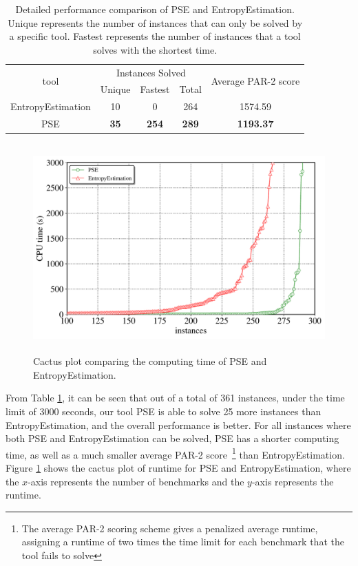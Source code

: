 \begin{table}[h!]
	\centering
	\begin{tabular}{ ccccc } 
		\toprule 
		\multirow{2}{*}{tool}  & \multicolumn{3}{c}{Instances Solved} & \multirow{2}{*}{Average PAR-2 score} \\
		 \cline{2-4}
		& Unique & Fastest & Total \\ 
		\midrule 
		EntropyEstimation & 10 & 0 & 264 & 1574.59 \\ 
		
		PSE & \textbf{35} & \textbf{254} & \textbf{289} & \textbf{1193.37} \\
		\bottomrule
	\end{tabular}
	\caption{Detailed performance comparison of PSE and EntropyEstimation. Unique represents the number of instances that can only be solved by a specific tool. Fastest represents the number of instances that a tool solves with the shortest time.}
	\label{table:2}
\end{table}

\begin{figure}[htbp]
	\centering
	\includegraphics[width=12cm,height=8cm]{figures/PSEvsEntropyEstimation.pdf}
	\caption{Cactus plot comparing the computing time of PSE and EntropyEstimation.
	}
	\label{figure:2}
\end{figure} 

From Table \ref{table:2}, it can be seen that out of a total of 361 instances, under the time limit of 3000 seconds, our tool PSE is able to solve 25 more instances than EntropyEstimation, and the overall performance is better. 
For all instances where both PSE and EntropyEstimation can be solved, PSE has a shorter computing time, as well as a much smaller average PAR-2 score~\footnote{The average PAR-2 scoring scheme gives a penalized average runtime, assigning a runtime of two times the time limit for each benchmark that the tool fails to solve} than EntropyEstimation.
Figure \ref{figure:2} shows the cactus plot of runtime for PSE and EntropyEstimation, where the $x$-axis represents the number of benchmarks and the $y$-axis represents the runtime.

